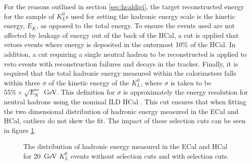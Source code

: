For the reasons outlined in section \ref{sec:hcaldigi}, the target reconstructed energy for the sample of $K^{0}_{L}$s used for setting the hadronic energy scale is the kinetic energy, $E_{K}$, as opposed to the total energy.  To ensure the events used are not affected by leakage of energy out of the back of the HCal, a cut is applied that vetoes events where energy is deposited in the outermost 10\% of the HCal.  In addition, a cut requiring a single neutral hadron to be reconstructed is applied to veto events with reconstruction failures and decays in the tracker.  Finally, it is required that the total hadronic energy measured within the calorimeters falls within three $\sigma$ of the kinetic energy of the $K^{0}_{L}$, where $\sigma$ is taken to be $55\% \times \sqrt{E_{K}}$~GeV.  This definition for $\sigma$ is approximately the energy resolution for neutral hadrons using the nominal ILD HCal \cite{Behnke:2013lya}.  This cut ensures that when fitting the two dimensional distribution of hadronic energy measured in the ECal and HCal, outliers do not skew the fit.   The impact of these selection cuts can be seen in figure \ref{fig:hadscaleselection}.

\begin{figure}[h!]
\caption[The distribution of hadronic energy measured in the ECal and HCal for 20~GeV $K^{0}_{L}$ events with and without selection cuts.]{The distribution of hadronic energy measured in the ECal and HCal for 20~GeV $K^{0}_{L}$ events \protect{} without selection cuts and \protect{} with selection cuts.}
\label{fig:hadscaleselection}
\end{figure}

